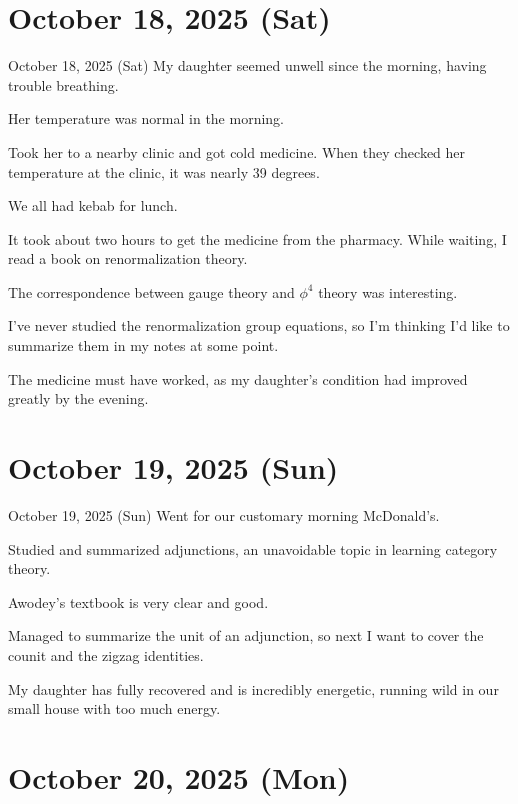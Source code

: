 \documentclass[dvipdfmx, autodetect-engine, aspectratio=169, 10.5pt]{beamer}
\begin{document}
\section{October 18, 2025 (Sat)}

\begin{frame}{October 18, 2025 (Sat)}
My daughter seemed unwell since the morning, having trouble breathing.

Her temperature was normal in the morning.

Took her to a nearby clinic and got cold medicine.
When they checked her temperature at the clinic, it was nearly 39 degrees.

We all had kebab for lunch.

It took about two hours to get the medicine from the pharmacy.
While waiting, I read a book on renormalization theory.

The correspondence between gauge theory and $\phi^{4}$ theory was interesting.

I've never studied the renormalization group equations, so I'm thinking I'd like to summarize them in my notes at some point.

The medicine must have worked, as my daughter's condition had improved greatly by the evening.
\end{frame}

\section{October 19, 2025 (Sun)}

\begin{frame}{October 19, 2025 (Sun)}
Went for our customary morning McDonald's.

Studied and summarized adjunctions, an unavoidable topic in learning category theory.

Awodey's textbook is very clear and good.

Managed to summarize the unit of an adjunction, so next I want to cover the counit and the zigzag identities.

My daughter has fully recovered and is incredibly energetic, running wild in our small house with too much energy.
\end{frame}

\section{October 20, 2025 (Mon)}
\end{document}
